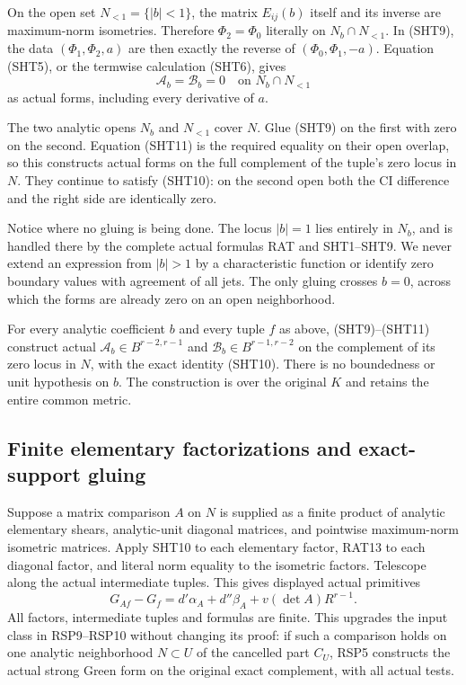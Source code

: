 On the open set $N_{<1}=\{|b|<1\}$, the matrix
$E_{ij}(b)$ itself and its inverse are maximum-norm
isometries.  Therefore $\Phi_2=\Phi_0$ literally
on $N_b\cap N_{<1}$.  In (SHT9), the data
$(\Phi_1,\Phi_2,a)$ are then exactly the reverse
of $(\Phi_0,\Phi_1,-a)$.  Equation (SHT5), or the
termwise calculation (SHT6), gives
\[
                  \mathcal A_b=\mathcal B_b=0
                                      \quad\text{on }N_b\cap N_{<1}
 \tag{SHT11}
\]
as actual forms, including every derivative of $a$.

The two analytic opens $N_b$ and $N_{<1}$ cover $N$.
Glue (SHT9) on the first with zero on the second.
Equation (SHT11) is the required equality on their
open overlap, so this constructs actual forms on
the full complement of the tuple's zero locus in
$N$.  They continue to satisfy (SHT10): on the
second open both the CI difference and the right
side are identically zero.

Notice where no gluing is being done.  The locus
$|b|=1$ lies entirely in $N_b$, and is handled
there by the complete actual formulas RAT and
SHT1--SHT9.  We never extend an expression from
$|b|>1$ by a characteristic function or identify
zero boundary values with agreement of all jets.
The only gluing crosses $b=0$, across which the
forms are already zero on an open neighborhood.

\begin{theorem}
\label{thm:r9-actual-elementary-shear-transgression}
For every analytic coefficient $b$ and every tuple
$f$ as above, (SHT9)--(SHT11) construct actual
$\mathcal A_b\in B^{r-2,r-1}$ and
$\mathcal B_b\in B^{r-1,r-2}$ on the complement
of its zero locus in $N$, with the exact identity
(SHT10).  There is no boundedness or unit hypothesis
on $b$.  The construction is over the original
$K$ and retains the entire common metric.
\end{theorem}

\subsection{Finite elementary factorizations and exact-support gluing}

Suppose a matrix comparison $A$ on $N$ is supplied
as a finite product of analytic elementary shears,
analytic-unit diagonal matrices, and pointwise
maximum-norm isometric matrices.  Apply SHT10 to
each elementary factor, RAT13 to each diagonal
factor, and literal norm equality to the isometric
factors.  Telescope along the actual intermediate
tuples.  This gives displayed actual primitives
\[
 G_{Af}-G_f=d'\alpha_A+d''\beta_A
                                  +v(\det A)R^{r-1}.
 \tag{SHT12}
\]
All factors, intermediate tuples and formulas
are finite.  This upgrades the input class in
RSP9--RSP10 without changing its proof: if such
a comparison holds on one analytic neighborhood
$N\subset U$ of the cancelled part $C_U$, RSP5
constructs the actual strong Green form on the
original exact complement, with all actual tests.

